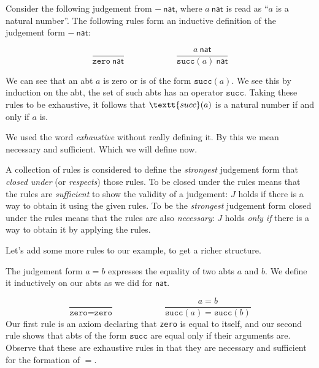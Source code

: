 \begin{example}
    Consider the following judgement from $-\ \mathsf{nat}$, where $a\ \mathsf{nat}$ is read as ``$a$ is a natural number''. The following rules form an inductive definition of the judgement form $-\ \mathsf{nat}$:

    $$\frac
        {}
        {\texttt{zero}\ \mathsf{nat}}
      \qquad\qquad\qquad
      \frac
        {a\ \mathsf{nat}}
        {\texttt{succ}(a)\ \mathsf{nat}}
    $$

    We can see that an abt $a$ is zero or is of the form $\texttt{succ}(a)$. We see this by induction on the abt, the set of such abts has an operator $\texttt{succ}$. Taking these rules to be exhaustive, it follows that $\textt{succ}(a)$ is a natural number if and only if $a$ is.
\end{example}

\begin{remark}
    We used the word \emph{exhaustive} without really defining it. By this we mean necessary and sufficient. Which we will define now.
\end{remark}

\begin{defin}
    A collection of rules is considered to define the \emph{strongest} judgement form that \emph{closed under} (or \emph{respects}) those rules. To be closed under the rules means that the rules are \emph{sufficient} to show the validity of a judgement: $J$ holds if there is a way to obtain it using the given rules. To be the \emph{strongest} judgement form closed under the rules means that the rules are also \emph{necessary}: $J$ holds \emph{only if} there is a way to obtain it by applying the rules.
\end{defin}

Let's add some more rules to our example, to get a richer structure.

\begin{example}
    The judgement form $a = b$ expresses the equality of two abts $a$ and $b$. We define it inductively on our abts as we did for $\mathsf{nat}$.
    
    $$\frac
        {}
        {\texttt{zero} = \texttt{zero}}
      \qquad\qquad\qquad
    \frac
        {a = b}
        {\texttt{succ}(a) = \texttt{succ}(b)}
    $$
    Our first rule is an axiom declaring that \texttt{zero} is equal to itself, and our second rule shows that abts of the form $\texttt{succ}$ are equal only if their arguments are. Observe that these are exhaustive rules in that they are necessary and sufficient for the formation of $=$.
\end{example}

